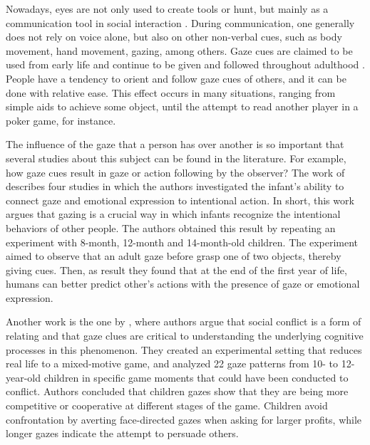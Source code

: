 \documentclass[10pt, conference]{IEEEtran}
\begin{document}
	Nowadays, eyes are not only used to create tools or hunt, but mainly as a communication tool in social interaction \cite{4}.
	During communication, one generally does not rely on voice alone, but also on other non-verbal cues, such as body movement, hand movement, gazing, among others.
	Gaze cues are claimed to be used from early life and continue to be given and followed throughout adulthood \cite{4}.
	People have a tendency to orient and follow gaze cues of others, and it can be done with relative ease.
	This effect occurs in many situations, ranging from simple aids to achieve some object, until the attempt to read another player in a poker game, for instance.

	The influence of the gaze that a person has over another is so important that several studies about this subject can be found in the literature.
	For example, how gaze cues result in gaze or action following by the observer? 
	The work of \cite{5} describes four studies in which the authors investigated the infant's ability to connect gaze and emotional expression to intentional action.
	In short, this work argues that gazing is a crucial way in which infants recognize the intentional behaviors of other people. 
	The authors obtained this result by repeating an experiment with 8-month, 12-month and 14-month-old children. 
	The experiment aimed to observe that an adult gaze before grasp one of two objects, thereby giving cues. 
	Then, as result they found that at the end of the first year of life, humans can better predict other's actions with the presence of gaze or emotional expression.
    
	Another work is the one by \cite{6}, where authors argue that social conflict is a form of relating and that gaze clues are critical to understanding the underlying cognitive processes in this phenomenon. 
	They created an experimental setting that reduces real life to a mixed-motive game, and analyzed 22 gaze patterns from 10- to 12-year-old children in specific game moments that could have been conducted to conflict.
	Authors concluded that children gazes show that they are being more competitive or cooperative at different stages of the game.
	Children avoid confrontation by averting face-directed gazes when asking for larger profits, while longer gazes indicate the attempt to persuade others.
\end{document}
